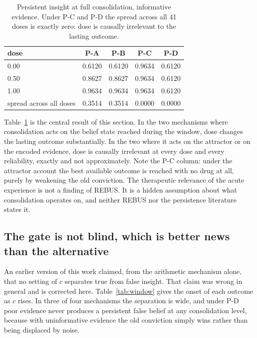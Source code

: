 \documentclass[11pt]{article}
\begin{document}
\begin{table}[t]
\centering
\caption{Persistent insight at full consolidation, informative evidence. Under P-C
and P-D the spread across all 41 doses is exactly zero: dose is causally irrelevant
to the lasting outcome.}
\label{tab:mech}
\begin{tabular}{lcccc}
\toprule
dose & P-A & P-B & P-C & P-D \\
\midrule
0.00 & 0.6120 & 0.6120 & 0.9634 & 0.6120 \\
0.50 & 0.8627 & 0.8627 & 0.9634 & 0.6120 \\
1.00 & 0.9634 & 0.9634 & 0.9634 & 0.6120 \\
\midrule
spread across all doses & 0.3514 & 0.3514 & 0.0000 & 0.0000 \\
\bottomrule
\end{tabular}
\end{table}

Table~\ref{tab:mech} is the central result of this section. In the two mechanisms
where consolidation acts on the belief state reached during the window, dose changes
the lasting outcome substantially. In the two where it acts on the attractor or on
the encoded evidence, dose is causally irrelevant at every dose and every
reliability, exactly and not approximately. Note the P-C column: under the attractor
account the best available outcome is reached with no drug at all, purely by
weakening the old conviction. The therapeutic relevance of the acute experience is
not a finding of REBUS. It is a hidden assumption about what consolidation operates
on, and neither REBUS nor the persistence literature states it.

\subsection{The gate is not blind, which is better news than the alternative}

An earlier version of this work claimed, from the arithmetic mechanism alone, that no
setting of $c$ separates true from false insight. That claim was wrong in general and
is corrected here. Table~\ref{tab:window} gives the onset of each outcome as $c$
rises. In three of four mechanisms the separation is wide, and under P-D poor
evidence never produces a persistent false belief at any consolidation level, because
with uninformative evidence the old conviction simply wins rather than being
displaced by noise.
\end{document}
